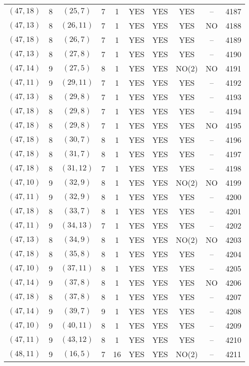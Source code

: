 \begin{longtable}{|c|c|c|c|c|c|c|c|c|c|}
$(47, 18)$ & 8 & $(25, 7)$ & 7 & 1 & YES & YES & YES & -- & 4187\\
$(47, 13)$ & 8 & $(26, 11)$ & 7 & 1 & YES & YES & YES & NO & 4188\\
$(47, 18)$ & 8 & $(26, 7)$ & 7 & 1 & YES & YES & YES & -- & 4189\\
$(47, 13)$ & 8 & $(27, 8)$ & 7 & 1 & YES & YES & YES & -- & 4190\\
$(47, 14)$ & 9 & $(27, 5)$ & 8 & 1 & YES & YES & NO(2) & NO & 4191\\
$(47, 11)$ & 9 & $(29, 11)$ & 7 & 1 & YES & YES & YES & -- & 4192\\
$(47, 13)$ & 8 & $(29, 8)$ & 7 & 1 & YES & YES & YES & -- & 4193\\
$(47, 18)$ & 8 & $(29, 8)$ & 7 & 1 & YES & YES & YES & -- & 4194\\
$(47, 18)$ & 8 & $(29, 8)$ & 7 & 1 & YES & YES & YES & NO & 4195\\
$(47, 18)$ & 8 & $(30, 7)$ & 8 & 1 & YES & YES & YES & -- & 4196\\
$(47, 18)$ & 8 & $(31, 7)$ & 8 & 1 & YES & YES & YES & -- & 4197\\
$(47, 18)$ & 8 & $(31, 12)$ & 7 & 1 & YES & YES & YES & -- & 4198\\
$(47, 10)$ & 9 & $(32, 9)$ & 8 & 1 & YES & YES & NO(2) & NO & 4199\\
$(47, 11)$ & 9 & $(32, 9)$ & 8 & 1 & YES & YES & YES & -- & 4200\\
$(47, 18)$ & 8 & $(33, 7)$ & 8 & 1 & YES & YES & YES & -- & 4201\\
$(47, 11)$ & 9 & $(34, 13)$ & 7 & 1 & YES & YES & YES & -- & 4202\\
$(47, 13)$ & 8 & $(34, 9)$ & 8 & 1 & YES & YES & NO(2) & NO & 4203\\
$(47, 18)$ & 8 & $(35, 8)$ & 8 & 1 & YES & YES & YES & -- & 4204\\
$(47, 10)$ & 9 & $(37, 11)$ & 8 & 1 & YES & YES & YES & -- & 4205\\
$(47, 14)$ & 9 & $(37, 8)$ & 8 & 1 & YES & YES & YES & NO & 4206\\
$(47, 18)$ & 8 & $(37, 8)$ & 8 & 1 & YES & YES & YES & -- & 4207\\
$(47, 14)$ & 9 & $(39, 7)$ & 9 & 1 & YES & YES & YES & -- & 4208\\
$(47, 10)$ & 9 & $(40, 11)$ & 8 & 1 & YES & YES & YES & -- & 4209\\
$(47, 11)$ & 9 & $(43, 12)$ & 8 & 1 & YES & YES & YES & -- & 4210\\
$(48, 11)$ & 9 & $(16, 5)$ & 7 & 16 & YES & YES & NO(2) & -- & 4211\\

\end{longtable}
